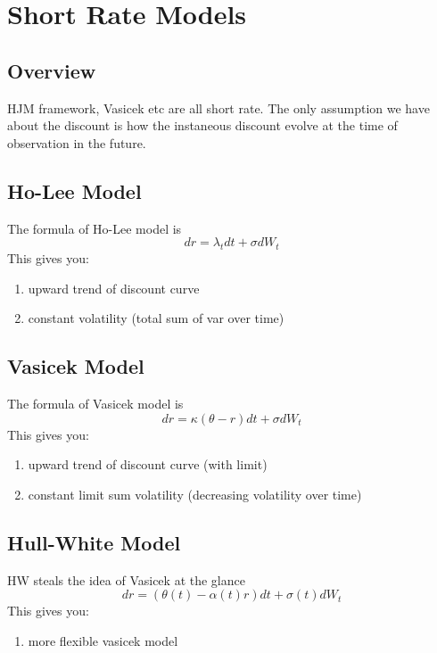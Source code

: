 \newpage
\section{Short Rate Models}
\subsection{Overview}
HJM framework, Vasicek etc are all short rate. The only assumption we have about the discount is how the instaneous discount evolve at the time of observation in the future.

\subsection{Ho-Lee Model}
The formula of Ho-Lee model is
\begin{equation}
dr = \lambda_t dt + \sigma dW_t
\end{equation}
This gives you:
\begin{enumerate}
\item upward trend of discount curve
\item constant volatility (total sum of var over time)
\end{enumerate}


\subsection{Vasicek Model}
The formula of Vasicek model is
\begin{equation}
dr = \kappa (\theta - r) dt + \sigma dW_t
\end{equation}
This gives you:
\begin{enumerate}
\item upward trend of discount curve (with limit)
\item constant limit {\color{red}sum} volatility (decreasing volatility over time)
\end{enumerate}



\subsection{Hull-White Model}
HW steals the idea of Vasicek at the glance
\begin{equation}
dr = (\theta(t) - \alpha(t)r) dt + \sigma(t) dW_t
\end{equation}
This gives you:
\begin{enumerate}
\item more flexible vasicek model
\end{enumerate}

